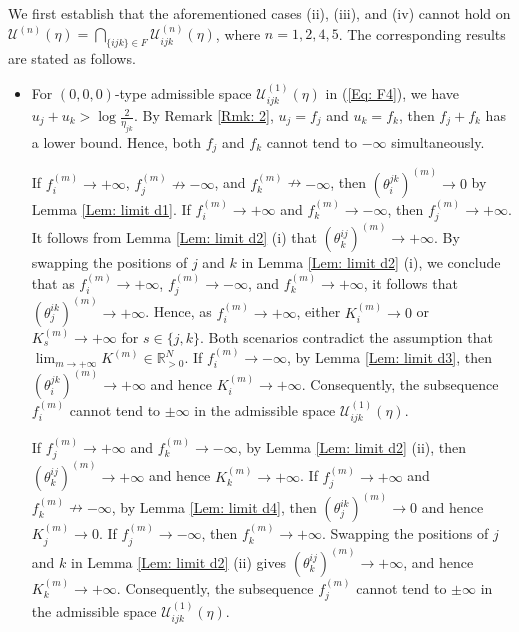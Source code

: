 \documentclass[12pt]{amsart}
\theoremstyle{definition}
\begin{document}
We first establish that the aforementioned cases (ii), (iii), and (iv) cannot hold on $\mathcal{U}^{(n)}(\eta)=\bigcap_{\{ijk\}\in F}\mathcal{U}^{(n)}_{ijk}(\eta)$, where $n=1,2,4,5$.
The corresponding results are stated as follows.
\begin{itemize}
\item[(1)]
For $(0,0,0)$-type admissible space $\mathcal{U}^{(1)}_{ijk}(\eta)$ in (\ref{Eq: F4}), we have $u_j+u_k>\log \frac{2}{\eta_{jk}}$.
By Remark \ref{Rmk: 2}, $u_j=f_j$ and $u_k=f_k$, then $f_j+f_k$ has a lower bound.
Hence, both $f_j$ and $f_k$ cannot tend to $-\infty$ simultaneously.

If $f_i^{(m)}\rightarrow +\infty$, $f_j^{(m)}\nrightarrow -\infty$, and $f_k^{(m)}\nrightarrow -\infty$,
then $(\theta^{jk}_i)^{(m)}\rightarrow 0$ by Lemma \ref{Lem: limit d1}.
If $f_i^{(m)}\rightarrow +\infty$ and $f_k^{(m)}\rightarrow -\infty$, then $f_j^{(m)}\rightarrow +\infty$.
It follows from Lemma \ref{Lem: limit d2} (i) that $(\theta^{ij}_k)^{(m)}\rightarrow +\infty$.
By swapping the positions of $j$ and $k$ in Lemma \ref{Lem: limit d2} (i), we conclude that as $f_i^{(m)}\rightarrow +\infty$, $f_j^{(m)}\rightarrow -\infty$, and $f_k^{(m)}\rightarrow +\infty$,
it follows that $(\theta^{ik}_j)^{(m)}\rightarrow +\infty$.
Hence, as $f_i^{(m)}\rightarrow +\infty$, either $K^{(m)}_i\rightarrow 0$ or $K^{(m)}_s\rightarrow +\infty$ for $s\in\{j,k\}$.
Both scenarios contradict the assumption that $\lim_{m\rightarrow +\infty}K^{(m)}\in \mathbb{R}^N_{>0}$.
If $f_i^{(m)}\rightarrow -\infty$, by Lemma \ref{Lem: limit d3}, then $(\theta^{jk}_i)^{(m)}\rightarrow +\infty$ and hence $K^{(m)}_i\rightarrow +\infty$.
Consequently, the subsequence $f^{(m)}_i$ cannot tend to $\pm\infty$ in the admissible space $\mathcal{U}^{(1)}_{ijk}(\eta)$.

If $f_j^{(m)}\rightarrow +\infty$ and  $f_k^{(m)}\rightarrow -\infty$, by Lemma \ref{Lem: limit d2} (ii), then $(\theta^{ij}_k)^{(m)}\rightarrow +\infty$ and hence $K^{(m)}_k\rightarrow +\infty$.
If $f_j^{(m)}\rightarrow +\infty$ and  $f_k^{(m)}\nrightarrow -\infty$, by Lemma \ref{Lem: limit d4},
then $(\theta^{ik}_j)^{(m)}\rightarrow 0$ and hence $K^{(m)}_j\rightarrow 0$.
If $f_j^{(m)}\rightarrow -\infty$, then $f_k^{(m)}\rightarrow +\infty$.
Swapping the positions of $j$ and $k$ in Lemma \ref{Lem: limit d2} (ii) gives $(\theta^{ij}_k)^{(m)}\rightarrow +\infty$, and
hence $K^{(m)}_k\rightarrow +\infty$.
Consequently, the subsequence $f^{(m)}_j$ cannot tend to $\pm\infty$ in the admissible space $\mathcal{U}^{(1)}_{ijk}(\eta)$.


\end{itemize}
\end{document}
